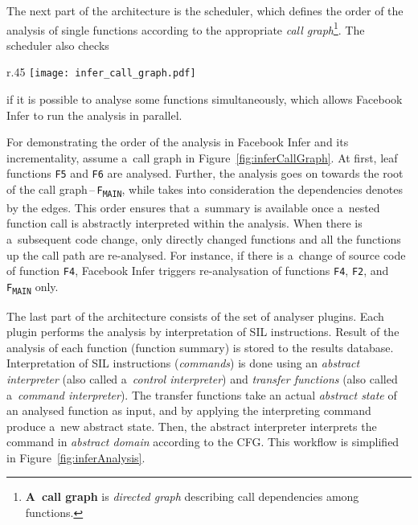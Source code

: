 The next part of the architecture is the scheduler, which defines the
order of the analysis of single functions according to the appropriate
\emph{call graph}\footnote{\textbf{A~call graph} is \emph{directed graph}
describing call dependencies among functions.}. The scheduler also checks
\begin{wrapfigure}{r}{.45 \linewidth}
    \centering
    \vspace{-.5em}
    \texttt{[image: infer\_call\_graph.pdf]}
    \caption{%
        A~call graph for an illustration of Facebook Infer's
        analysis process~\cite{inferAISlides}, \cite{excel2019FBInfer},
        \cite{projectPracticeMarcin2018}
    }
    \label{fig:inferCallGraph}
\end{wrapfigure}
if it is possible to analyse some functions simultaneously, which allows
Facebook Infer to run the analysis in parallel.

\begin{example}
    For demonstrating the order of the analysis in Facebook Infer and its
    incrementality, assume a~call graph in Figure~\ref{fig:inferCallGraph}.
    At first, leaf functions \texttt{F5} and \texttt{F6} are analysed. Further,
    the analysis goes on towards the root of the call
    graph\,--\,\texttt{F\textsubscript{MAIN}}, while takes into consideration
    the dependencies denotes by the edges. This order ensures that a~summary
    is available once a~nested function call is abstractly interpreted within
    the analysis. When there is a~subsequent code change, only directly changed
    functions and all the functions up the call path are re-analysed. For
    instance, if there is a~change of source code of function \texttt{F4},
    Facebook Infer triggers re-analysation of functions \texttt{F4},
    \texttt{F2}, and \texttt{F\textsubscript{MAIN}} only.
\end{example}

The last part of the architecture consists of the set of analyser plugins.
Each plugin performs the analysis by interpretation of SIL instructions.
Result of the analysis of each function (function summary) is stored to
the results database. Interpretation of SIL instructions (\emph{commands})
is done using an \emph{abstract interpreter} (also called a~\emph{control
interpreter}) and \emph{transfer functions} (also called a~\emph{command
interpreter}). The transfer functions take an actual \emph{abstract state}
of an analysed function as input, and by applying the interpreting command
produce a~new abstract state. Then, the abstract interpreter interprets the
command in \emph{abstract domain} according to the CFG. This workflow is
simplified in Figure~\ref{fig:inferAnalysis}.

